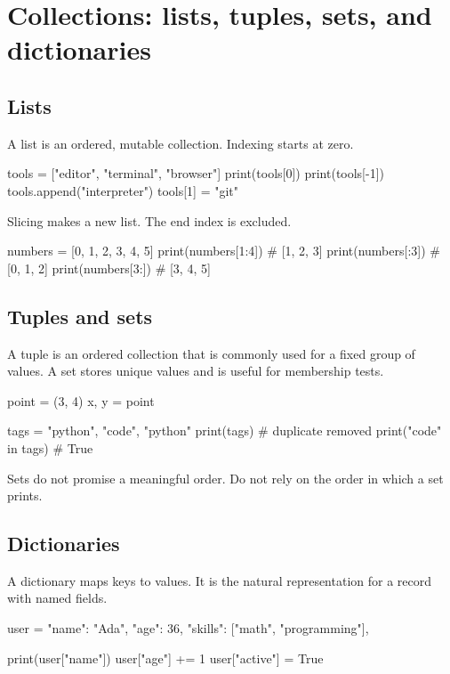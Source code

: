 \documentclass[11pt,openany,oneside]{book}
\begin{document}
\chapter{Collections: lists, tuples, sets, and dictionaries}

\section{Lists}

A list is an ordered, mutable collection. Indexing starts at zero.

\begin{code}[language=Python]
tools = ["editor", "terminal", "browser"]
print(tools[0])
print(tools[-1])
tools.append("interpreter")
tools[1] = "git"
\end{code}

Slicing makes a new list. The end index is excluded.

\begin{code}[language=Python]
numbers = [0, 1, 2, 3, 4, 5]
print(numbers[1:4])  # [1, 2, 3]
print(numbers[:3])   # [0, 1, 2]
print(numbers[3:])   # [3, 4, 5]
\end{code}

\section{Tuples and sets}

A tuple is an ordered collection that is commonly used for a fixed group of values. A set stores unique values and is useful for membership tests.

\begin{code}[language=Python]
point = (3, 4)
x, y = point

tags = {"python", "code", "python"}
print(tags)                 # duplicate removed
print("code" in tags)       # True
\end{code}

Sets do not promise a meaningful order. Do not rely on the order in which a set prints.

\section{Dictionaries}

A dictionary maps keys to values. It is the natural representation for a record with named fields.

\begin{code}[language=Python]
user = {
    "name": "Ada",
    "age": 36,
    "skills": ["math", "programming"],
}

print(user["name"])
user["age"] += 1
user["active"] = True
\end{code}
\end{document}
